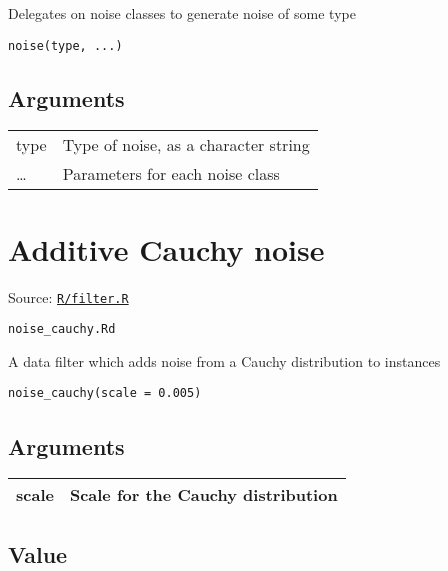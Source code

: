 Delegates on noise classes to generate noise of some type

\begin{verbatim}
noise(type, ...)
\end{verbatim}

\hypertarget{arguments}{\subsection{\texorpdfstring{\protect\hyperlink{arguments}{}Arguments}{Arguments}}\label{arguments}}

\begin{longtable}[c]{@{}>{\small}p{3cm}>{\raggedright}p{12.5cm}@{}}
\toprule
type & Type of noise, as a character string\tabularnewline
\ldots{} & Parameters for each noise class\tabularnewline
\bottomrule
\end{longtable}

\section{Additive Cauchy noise}\label{additive-cauchy-noise}

Source:
\href{https://github.com/fdavidcl/ruta/blob/master/R/filter.R}{\texttt{R/filter.R}}

\texttt{noise\_cauchy.Rd}

A data filter which adds noise from a Cauchy distribution to instances

\begin{verbatim}
noise_cauchy(scale = 0.005)
\end{verbatim}

\hypertarget{arguments}{\subsection{\texorpdfstring{\protect\hyperlink{arguments}{}Arguments}{Arguments}}\label{arguments}}

\begin{longtable}[c]{@{}>{\small}p{3cm}>{\raggedright}p{12.5cm}@{}}
\toprule
scale & Scale for the Cauchy distribution\tabularnewline
\bottomrule
\end{longtable}

\hypertarget{value}{\subsection{\texorpdfstring{\protect\hyperlink{value}{}Value}{Value}}\label{value}}

